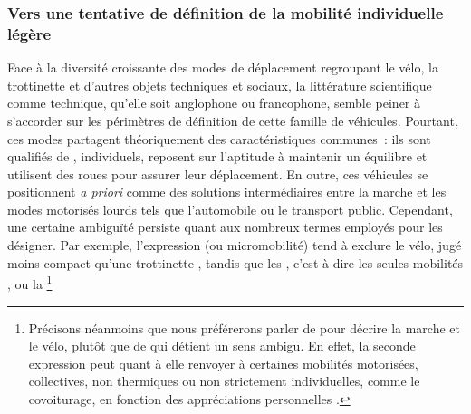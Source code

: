 \begin{refsegment}
\subsubsection*{Vers une tentative de définition de la mobilité individuelle légère
    \label{chap1:mobilite-individuelle-legere-definition}
    }

Face à la diversité croissante des modes de déplacement regroupant le vélo, la trottinette et d'autres objets techniques et sociaux, la littérature scientifique comme technique, qu’elle soit anglophone ou francophone, semble peiner à s’accorder sur les périmètres de définition de cette famille de véhicules. Pourtant, ces modes partagent théoriquement des caractéristiques communes~: ils sont qualifiés de , individuels, reposent sur l’aptitude à maintenir un équilibre et utilisent des roues pour assurer leur déplacement. En outre, ces véhicules se positionnent \textsl{a priori} comme des solutions intermédiaires entre la marche et les modes motorisés lourds tels que l’automobile ou le transport public. Cependant, une certaine ambiguïté persiste quant aux nombreux termes employés pour les désigner. Par exemple, l'expression  (ou micromobilité) tend à exclure le vélo, jugé moins compact qu’une trottinette \textcolor{blue}{\autocite[2, 4]{litman_new_2021}}, tandis que les , c'est-à-dire les seules mobilités  \textcolor{blue}{\autocite{illich_energie_1973}}, ou la \footnote{
    Précisons néanmoins que nous préférerons parler de  pour décrire la marche et le vélo, plutôt que de  qui détient un sens ambigu. En effet, la seconde expression peut quant à elle renvoyer à certaines mobilités motorisées, collectives, non thermiques ou non strictement individuelles, comme le covoiturage, en fonction des appréciations personnelles \textcolor{blue}{\autocite[240-241]{demailly_mobilite_2021}}.
}
\end{refsegment}
